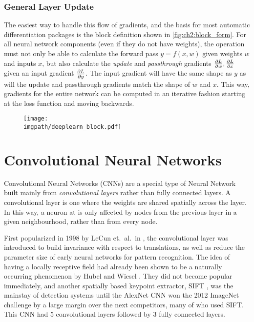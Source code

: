 \subsubsection{General Layer Update}
The easiest way to handle this flow of gradients, and the basis for most
automatic differentiation packages is the block definition shown in
\autoref{fig:ch2:block_form}. For all neural network components (even if they do
not have weights), the operation must not only be able to calculate the forward
pass $y=f(x, w)$ given weights $w$ and inputs $x$, but also calculate the
\emph{update} and \emph{passthrough} gradients $\frac{\partial L}{\partial w}, \frac{\partial L}{\partial x}$ given
an input gradient $\frac{\partial L}{\partial y}$. The input gradient will have the same shape as
$y$ as will the update and passthrough gradients match the shape of $w$ and $x$.
This way, gradients for the entire network can be computed in an iterative
fashion starting at the loss function and moving backwards.

\begin{figure}
  \centering
  \texttt{[image: \\imgpath/deeplearn\_block.pdf]}
  \label{fig:ch2:block_form}
\end{figure}

\section{Convolutional Neural Networks}\label{sec:ch2:cnns}
Convolutional Neural Networks (CNNs) are a special type of Neural Network built mainly from
\emph{convolutional layers} rather than fully connected layers. A convolutional
layer is one where the weights are shared spatially across the layer.
In this way, a neuron at is only affected by
nodes from the previous layer in a given neighbourhood, rather than from every node.

First popularized in 1998 by LeCun et.\ al.\ in \cite{lecun_gradient-based_1998},
the convolutional layer was introduced to build invariance with respect to
translations, as well as reduce the parameter size of early neural networks for
pattern recognition. The idea of having a locally receptive field had already
been shown to be a naturally occurring phenomenon by Hubel and Wiesel
\cite{hubel_receptive_1962}. They did not become popular immediately, and
another spatially based keypoint extractor, SIFT \cite{lowe_distinctive_2004},
was the mainstay of detection systems until the AlexNet CNN
\cite{krizhevsky_imagenet_2012} won the 2012 ImageNet challenge
\cite{russakovsky_imagenet_2014} by a large margin over the next competitors, many of
who used SIFT. This CNN had 5 convolutional layers followed by 3 fully
connected layers.

